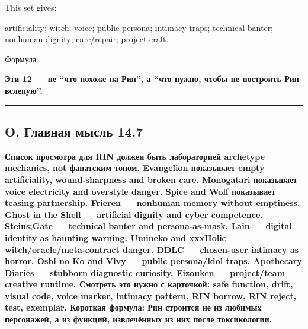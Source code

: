 This set gives:

artificiality; witch; voice; public persona; intimacy traps; technical
banter; nonhuman dignity; care/\hspace{0pt}repair; project craft.

Формула:

\textbf{Эти 12 --- не ``что похоже на Рин'', а ``что нужно, чтобы не
построить Рин вслепую''.}

\begin{center}\rule{0.5\linewidth}{0.5pt}\end{center}

\subsection*{O. Главная мысль 14.7}

\textbf{Список просмотра для RIN должен быть лабораторией archetype
mechanics, not фанатским топом. Evangelion показывает empty
artificiality, wound-sharpness and broken care. Monogatari показывает
voice electricity and overstyle danger. Spice and Wolf показывает
teasing partnership. Frieren --- nonhuman memory without emptiness.
Ghost in the Shell --- artificial dignity and cyber competence.
Steins;Gate --- technical banter and persona-as-mask. Lain --- digital
identity as haunting warning. Umineko and xxxHolic ---
witch/\hspace{0pt}oracle/\hspace{0pt}meta-contract danger. DDLC --- chosen-user intimacy as
horror. Oshi no Ko and Vivy --- public persona/\hspace{0pt}idol traps. Apothecary
Diaries --- stubborn diagnostic curiosity. Eizouken --- project/\hspace{0pt}team
creative runtime. Смотреть это нужно с карточкой: safe function, drift,
visual code, voice marker, intimacy pattern, RIN borrow, RIN reject,
test, exemplar. Короткая формула: Рин строится не из любимых персонажей,
а из функций, извлечённых из них после токсикологии.}
